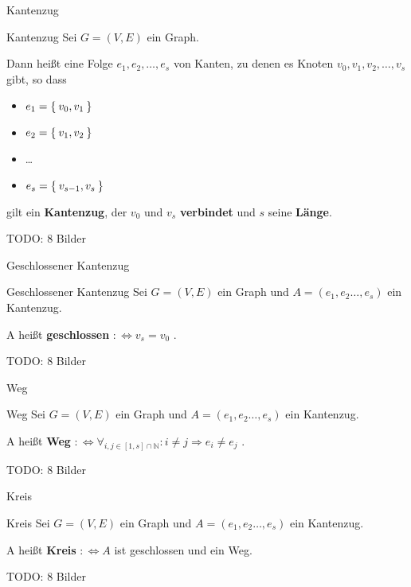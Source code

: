 \begin{frame}{Kantenzug}
\begin{block}{Kantenzug}
Sei $G = (V, E)$ ein Graph.

Dann heißt eine Folge $e_1, e_2, \dots, e_s$ von Kanten, zu denen es Knoten
$v_0, v_1, v_2, \dots, v_s$ gibt, so dass
\begin{itemize}
    \item $e_1 = \Set{v_0, v_1}$
    \item $e_2 = \Set{v_1, v_2}$
    \item \dots
    \item $e_s = \Set{v_{s-1}, v_s}$
\end{itemize}
gilt ein \textbf{Kantenzug}, der $v_0$ und $v_s$ \textbf{verbindet} und $s$ 
seine \textbf{Länge}.
\end{block}

TODO: 8 Bilder
\end{frame}

\begin{frame}{Geschlossener Kantenzug}
\begin{block}{Geschlossener Kantenzug}
Sei $G = (V, E)$ ein Graph und $A = (e_1, e_2 \dots, e_s)$ ein Kantenzug.

A heißt \textbf{geschlossen} $:\Leftrightarrow v_s = v_0$ .
\end{block}

TODO: 8 Bilder
\end{frame}

\begin{frame}{Weg}
\begin{block}{Weg}
Sei $G = (V, E)$ ein Graph und $A = (e_1, e_2 \dots, e_s)$ ein Kantenzug.

A heißt \textbf{Weg} $:\Leftrightarrow \forall_{i, j \in [1, s] \cap \mathbb{N}}: i \neq j \Rightarrow e_i \neq e_j$ .
\end{block}

TODO: 8 Bilder
\end{frame}

\begin{frame}{Kreis}
\begin{block}{Kreis}
Sei $G = (V, E)$ ein Graph und $A = (e_1, e_2 \dots, e_s)$ ein Kantenzug.

A heißt \textbf{Kreis} $:\Leftrightarrow A$ ist geschlossen und ein Weg.
\end{block}

TODO: 8 Bilder
\end{frame}

